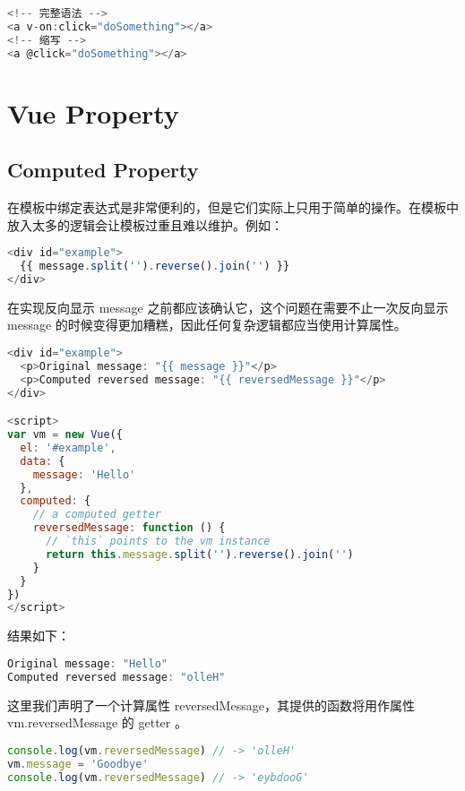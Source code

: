 \begin{lstlisting}[language=JavaScript]
<!-- 完整语法 -->
<a v-on:click="doSomething"></a>
<!-- 缩写 -->
<a @click="doSomething"></a>
\end{lstlisting}

\chapter{Vue Property}


\section{Computed Property}


在模板中绑定表达式是非常便利的，但是它们实际上只用于简单的操作。在模板中放入太多的逻辑会让模板过重且难以维护。例如：

\begin{lstlisting}[language=JavaScript]
<div id="example">
  {{ message.split('').reverse().join('') }}
</div>
\end{lstlisting}

在实现反向显示 message 之前都应该确认它，这个问题在需要不止一次反向显示 message 的时候变得更加糟糕，因此任何复杂逻辑都应当使用计算属性。



\begin{lstlisting}[language=JavaScript]
<div id="example">
  <p>Original message: "{{ message }}"</p>
  <p>Computed reversed message: "{{ reversedMessage }}"</p>
</div>

<script>
var vm = new Vue({
  el: '#example',
  data: {
    message: 'Hello'
  },
  computed: {
    // a computed getter
    reversedMessage: function () {
      // `this` points to the vm instance
      return this.message.split('').reverse().join('')
    }
  }
})
</script>
\end{lstlisting}

结果如下：


\begin{lstlisting}[language=JavaScript]
Original message: "Hello"
Computed reversed message: "olleH"
\end{lstlisting}

这里我们声明了一个计算属性 reversedMessage，其提供的函数将用作属性 vm.reversedMessage 的 getter 。


\begin{lstlisting}[language=JavaScript]
console.log(vm.reversedMessage) // -> 'olleH'
vm.message = 'Goodbye'
console.log(vm.reversedMessage) // -> 'eybdooG'
\end{lstlisting}

